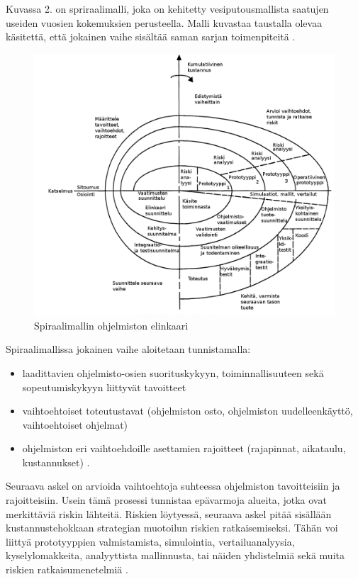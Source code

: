 \documentclass[finnish]{tktltiki2}
\theoremstyle{definition}
\theoremstyle{remark}
\begin{document}
Kuvassa 2. on spriraalimalli, joka on kehitetty vesiputousmallista saatujen useiden vuosien kokemuksien perusteella. Malli kuvastaa taustalla olevaa käsitettä, että jokainen vaihe sisältää saman sarjan toimenpiteitä \cite{BOE88}.

\begin{figure}[h!]
  \caption{Spiraalimallin ohjelmiston elinkaari}
  \centering
    \includegraphics[width=\textwidth]{spiral}
\end{figure}

Spiraalimallissa jokainen vaihe aloitetaan tunnistamalla:
\begin{itemize}
  \item laadittavien ohjelmisto-osien suorituskykyyn, toiminnallisuuteen sekä sopeutumiskykyyn liittyvät tavoitteet
  \item vaihtoehtoiset toteutustavat (ohjelmiston osto, ohjelmiston uudelleenkäyttö, vaihtoehtoiset ohjelmat)
  \item ohjelmiston eri vaihtoehdoille asettamien rajoitteet (rajapinnat, aikataulu, kustannukset) \cite{BOE88}.
\end{itemize}

Seuraava askel on arvioida vaihtoehtoja suhteessa ohjelmiston tavoitteisiin ja rajoitteisiin. Usein tämä prosessi tunnistaa epävarmoja alueita, jotka ovat merkittäviä riskin lähteitä. Riskien löytyessä, seuraava askel pitää sisällään kustannustehokkaan strategian muotoilun riskien ratkaisemiseksi. Tähän voi liittyä prototyyppien valmistamista, simulointia, vertailuanalyysia, kyselylomakkeita, analyyttista mallinnusta, tai näiden yhdistelmiä sekä muita riskien ratkaisumenetelmiä \cite{BOE88}.
\end{document}
